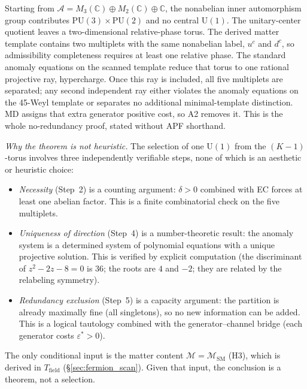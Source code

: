 \documentclass[11pt]{article}
\theoremstyle{definition}
\newcommand{\U}{\mathrm{U}}
\begin{document}
\begin{tcolorbox}[apfbox, title={Unique $\U(1)$ proof in conventional language}]
\footnotesize
Starting from $\mathcal A=M_3(\mathbb C)\oplus M_2(\mathbb C)\oplus\mathbb C$, the nonabelian inner automorphism group contributes $\mathrm{PU}(3)\times\mathrm{PU}(2)$ and no central $\U(1)$.  The unitary-center quotient leaves a two-dimensional relative-phase torus.  The derived matter template contains two multiplets with the same nonabelian label, $u^c$ and $d^c$, so admissibility completeness requires at least one relative phase.  The standard anomaly equations on the scanned template reduce that torus to one rational projective ray, hypercharge.  Once this ray is included, all five multiplets are separated; any second independent ray either violates the anomaly equations on the 45-Weyl template or separates no additional minimal-template distinction.  MD assigns that extra generator positive cost, so A2 removes it.  This is the whole no-redundancy proof, stated without APF shorthand.
\end{tcolorbox}

\noindent\textit{Why the theorem is not heuristic.}\quad
The selection of one $\U(1)$ from the $(K-1)$-torus involves three
independently verifiable steps, none of which is an aesthetic or
heuristic choice:
\begin{itemize}[nosep]
  \item \textit{Necessity} (Step~2) is a counting argument:
  $\delta > 0$ combined with EC forces at least one abelian factor.
  This is a finite combinatorial check on the five multiplets.
  \item \textit{Uniqueness of direction} (Step~4) is a
  number-theoretic result: the anomaly system is a determined system
  of polynomial equations with a unique projective solution.  This is
  verified by explicit computation (the discriminant of
  $z^2 - 2z - 8 = 0$ is $36$; the roots are $4$ and $-2$; they are
  related by the relabeling symmetry).
  \item \textit{Redundancy exclusion} (Step~5) is a capacity
  argument: the partition is already maximally fine (all singletons),
  so no new information can be added.  This is a logical tautology
  combined with the generator--channel bridge (each generator costs
  $\varepsilon^* > 0$).
\end{itemize}
The only conditional input is the matter content
$\mathcal{M} = \mathcal{M}_{\mathrm{SM}}$ (H3), which is derived in
$T_{\mathrm{field}}$ (\S\ref{sec:fermion_scan}).  Given that input,
the conclusion is a theorem, not a selection.
\end{document}
